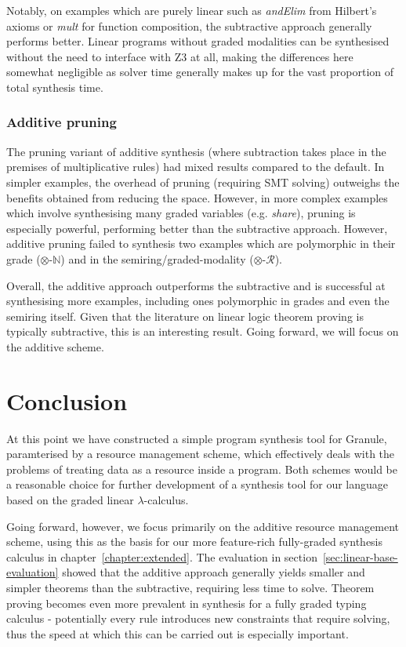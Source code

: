 Notably, on examples which are purely linear such as \textit{andElim} from
Hilbert's axioms or \textit{mult} for function composition, the subtractive
approach generally performs better. Linear programs without graded modalities
can be synthesised without the need to interface with Z3 at all, making the
differences here somewhat negligible as solver time generally makes up for the
vast proportion of total synthesis time.

\subsubsection{Additive pruning}
The pruning variant of additive synthesis (where subtraction
takes place in the premises of multiplicative rules) had mixed results
compared to the default. In simpler examples, the overhead of pruning
(requiring SMT solving) outweighs
the benefits obtained from reducing the space. However, in more
complex examples which involve synthesising many graded variables (e.g. \textit{share}), pruning is
especially powerful, performing better than the subtractive
approach. However, additive pruning failed to synthesis two
 examples which are polymorphic in their grade
 ($\otimes$-$\mathbb{N}$) and in the semiring/graded-modality ($\otimes$-$\mathcal{R}$).


Overall, the additive approach outperforms the subtractive and is successful at
synthesising more examples, including ones polymorphic in grades and even the
semiring itself. Given that the literature on linear logic theorem proving is
typically subtractive, this is an interesting result. Going forward, we will
focus on the additive scheme. 

\section{Conclusion}
\label{sec:linear-base-conclusion}

At this point we have constructed a simple program synthesis tool for Granule,
paramterised by a resource management scheme, which effectively deals with the
problems of treating data as a resource inside a program. Both schemes would be
a reasonable choice for further development of a synthesis tool for our language
based on the graded linear $\lambda$-calculus.   

Going forward, however, we focus primarily on the additive resource management
scheme, using this as the basis for our more feature-rich fully-graded synthesis
calculus in chapter~\ref{chapter:extended}.  
The evaluation in section~\ref{sec:linear-base-evaluation} showed that the
additive approach generally yields smaller and simpler theorems than the
subtractive, requiring less time to solve. Theorem proving becomes even more
prevalent in synthesis for a fully graded typing calculus - potentially every
rule introduces new constraints that require solving, thus the speed at which
this can be carried out is especially important.

